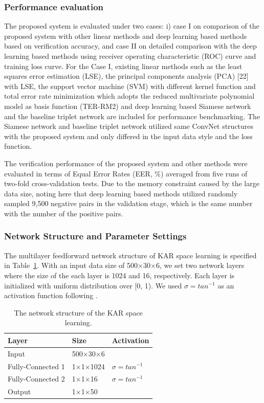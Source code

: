 \documentclass[runningheads]{llncs}
\begin{document}
\subsubsection{Performance evaluation}
The proposed system is evaluated under two cases: i) case I on comparison of the proposed system with other linear methods and deep learning based methods based on verification accuracy, and case II on detailed comparison with the deep learning based methods using receiver operating characteristic (ROC) curve and training loss curve. For the Case I, existing linear methods such as the least squares error estimation (LSE), the principal components analysis (PCA) [22] with LSE, the support vector machine (SVM) with different kernel function and total error rate minimization which adopts the reduced multivariate polynomial model as basis function (TER-RM2) \cite{toh2003fingerprint,toh2008between} and deep learning based Siamese network \cite{koch2015siamese} and the baseline triplet network \cite{hoffer2015deep} are included for performance benchmarking. The Siamese network and baseline triplet network utilized same ConvNet structures with the proposed system and only differed in the input data style and the loss function.

The verification performance of the proposed system and other methods were evaluated in terms of Equal Error Rates (EER, \%) averaged from five runs of two-fold cross-validation tests. Due to the memory constraint caused by the large data size, noting here that deep learning based methods utilized randomly sampled 9,500 negative pairs in the validation stage, which is the same number with the number of the positive pairs.

\subsubsection{Network Structure and Parameter Settings}
The multilayer feedforward network structure of KAR space learning is specified in Table~\ref{tab2}. With an input data size of 500$\times$30$\times$6, we set two network layers where the size of the each layer is 1024 and 16, respectively. Each layer is initialized with uniform distribution over [0, 1). We used $\sigma = {tan}^{-1}$ as an activation function following \cite{toh2018analytic}.

\begin{table}[]
    \caption{The network structure of the KAR space learning.}\label{tab2}
    \centering
    \begin{tabular}{|l|l|l|}
    \hline
    Layer   & Size     & Activation \\ \hline
    Input   & 500$\times$30$\times$6 &            \\
    Fully-Connected 1 & 1$\times$1$\times$1024 & $\sigma = {tan}^{-1}$     \\
    Fully-Connected 2 & 1$\times$1$\times$16  & $\sigma = {tan}^{-1}$     \\
    Output  & 1$\times$1$\times$50   &            \\ \hline
    \end{tabular}
\end{table}
\end{document}
